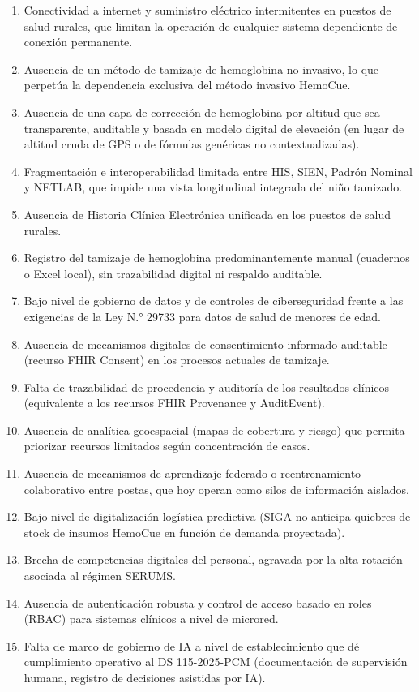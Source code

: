 \documentclass[11pt,a4paper]{article}
\providecommand{\tightlist}{%
  \setlength{\itemsep}{0pt}\setlength{\parskip}{0pt}}
\begin{document}
\begin{enumerate}
\def\labelenumi{\arabic{enumi}.}
\tightlist
\item
  Conectividad a internet y suministro eléctrico intermitentes en puestos de salud rurales, que limitan la operación de cualquier sistema dependiente de conexión permanente.
\item
  Ausencia de un método de tamizaje de hemoglobina no invasivo, lo que perpetúa la dependencia exclusiva del método invasivo HemoCue.
\item
  Ausencia de una capa de corrección de hemoglobina por altitud que sea transparente, auditable y basada en modelo digital de elevación (en lugar de altitud cruda de GPS o de fórmulas genéricas no contextualizadas).
\item
  Fragmentación e interoperabilidad limitada entre HIS, SIEN, Padrón Nominal y NETLAB, que impide una vista longitudinal integrada del niño tamizado.
\item
  Ausencia de Historia Clínica Electrónica unificada en los puestos de salud rurales.
\item
  Registro del tamizaje de hemoglobina predominantemente manual (cuadernos o Excel local), sin trazabilidad digital ni respaldo auditable.
\item
  Bajo nivel de gobierno de datos y de controles de ciberseguridad frente a las exigencias de la Ley N.° 29733 para datos de salud de menores de edad.
\item
  Ausencia de mecanismos digitales de consentimiento informado auditable (recurso FHIR Consent) en los procesos actuales de tamizaje.
\item
  Falta de trazabilidad de procedencia y auditoría de los resultados clínicos (equivalente a los recursos FHIR Provenance y AuditEvent).
\item
  Ausencia de analítica geoespacial (mapas de cobertura y riesgo) que permita priorizar recursos limitados según concentración de casos.
\item
  Ausencia de mecanismos de aprendizaje federado o reentrenamiento colaborativo entre postas, que hoy operan como silos de información aislados.
\item
  Bajo nivel de digitalización logística predictiva (SIGA no anticipa quiebres de stock de insumos HemoCue en función de demanda proyectada).
\item
  Brecha de competencias digitales del personal, agravada por la alta rotación asociada al régimen SERUMS.
\item
  Ausencia de autenticación robusta y control de acceso basado en roles (RBAC) para sistemas clínicos a nivel de microred.
\item
  Falta de marco de gobierno de IA a nivel de establecimiento que dé cumplimiento operativo al DS 115-2025-PCM (documentación de supervisión humana, registro de decisiones asistidas por IA).
\end{enumerate}
\end{document}
